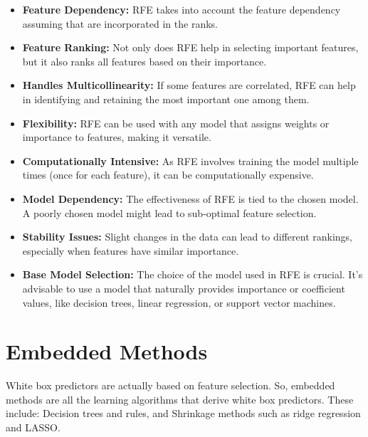 \begin{itemize}
    \item \textbf{Feature Dependency:} RFE takes into account the feature dependency assuming that are incorporated in the ranks.
    \item \textbf{Feature Ranking:} Not only does RFE help in selecting important features, but it also ranks all features based on their importance.
    \item \textbf{Handles Multicollinearity:} If some features are correlated, RFE can help in identifying and retaining the most important one among them.
    \item \textbf{Flexibility:} RFE can be used with any model that assigns weights or importance to features, making it versatile.
    \item \textbf{Computationally Intensive:} As RFE involves training the model multiple times (once for each feature), it can be computationally expensive.
    \item \textbf{Model Dependency:} The effectiveness of RFE is tied to the chosen model. A poorly chosen model might lead to sub-optimal feature selection.
    \item \textbf{Stability Issues:} Slight changes in the data can lead to different rankings, especially when features have similar importance.
    \item \textbf{Base Model Selection:} The choice of the model used in RFE is crucial. It's advisable to use a model that naturally provides importance or coefficient values, like decision trees, linear regression, or support vector machines.
\end{itemize}

\section*{Embedded Methods}
White box predictors are actually based on feature selection. So, embedded methods are all the learning algorithms that derive white box predictors. These include: Decision trees and rules, and Shrinkage methods such as ridge regression and LASSO.

